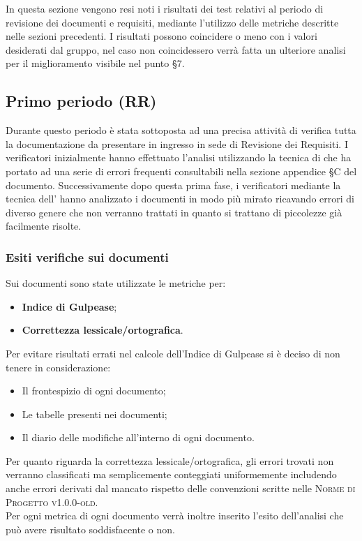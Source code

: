 \documentclass[../piano-di-qualifica.tex]{subfiles}
\begin{document}
In questa sezione vengono resi noti i risultati dei test relativi al periodo di revisione dei documenti e requisiti, mediante l'utilizzo delle metriche descritte nelle sezioni precedenti.
I risultati possono coincidere o meno con i valori desiderati dal gruppo, nel caso non coincidessero verrà fatta un ulteriore analisi per il miglioramento visibile nel punto §7.

\subsection{Primo periodo (RR)}
\label{sub:primo_periodo}
Durante questo periodo è stata sottoposta ad una precisa attività di verifica tutta la documentazione da presentare in ingresso in sede di Revisione dei Requisiti.
I verificatori inizialmente hanno effettuato l'analisi utilizzando la tecnica di  che ha portato ad una serie di errori frequenti consultabili nella sezione appendice §C del documento.
Successivamente dopo questa prima fase, i verificatori mediante la tecnica dell' hanno analizzato i documenti in modo più mirato ricavando errori di diverso genere che non verranno trattati in quanto si trattano di piccolezze già facilmente risolte.

\subsubsection{Esiti verifiche sui documenti}
\label{sub:esiti_verifiche_sui_documenti}
Sui documenti sono state utilizzate le metriche per:
    \begin{itemize}
        \item \textbf{Indice di Gulpease};
        \item \textbf{Correttezza lessicale/ortografica}.
    \end{itemize}
Per evitare risultati errati nel calcole dell'Indice di Gulpease si è deciso di non tenere in considerazione:
    \begin{itemize}
        \item Il frontespizio di ogni documento;
        \item Le tabelle presenti nei documenti;
        \item Il diario delle modifiche all'interno di ogni documento.
    \end{itemize}
Per quanto riguarda la correttezza lessicale/ortografica, gli errori trovati non verranno classificati ma semplicemente conteggiati uniformemente includendo anche errori derivati dal mancato rispetto delle convenzioni scritte nelle \textsc{Norme di Progetto v1.0.0-old}.
\\ Per ogni metrica di ogni documento verrà inoltre inserito l'esito dell'analisi che può avere risultato soddisfacente o non.
\end{document}
